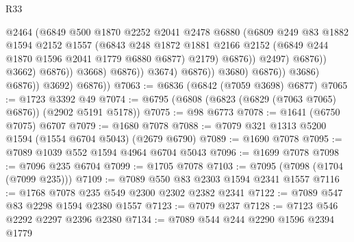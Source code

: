 \begin{lexlean}{R33}
\begin{coremodule}
                                              @2464
                                              (@6849
                                                @500
                                                @1870
                                                @2252
                                                @2041
                                                @2478
                                                @6880
                                                (@6809
                                                  @249
                                                  @83
                                                  @1882
                                                  @1594
                                                  @2152
                                                  @1557
                                                  (@6843
                                                    @248
                                                    @1872
                                                    @1881
                                                    @2166
                                                    @2152
                                                    (@6849 @244 @1870 @1596 @2041 @1779 @6880 @6877)
                                                    @2179)
                                                  @6876))
                                              @2497)
                                            @6876))
                                        @3662)
                                      @6876))
                                  @3668)
                                @6876))
                            @3674)
                          @6876))
                      @3680)
                    @6876))
                @3686)
              @6876))
          @3692)
        @6876))
@7063 := @6836 (@6842 (@7059 @3698) @6877)
@7065 := @1723 @3392 @49
@7074 := @6795 (@6808 (@6823 (@6829 (@7063 @7065) @6876)) (@2902 @5191 @5178))
@7075 := @98 @6773
@7078 := @1641 (@6750 @7075) @6707
@7079 := @1680 @7078
@7088 := @7079 @321 @1313 @5200 @1594 (@1554 @6704 @5043) (@2679 @6790)
@7089 := @1690 @7078
@7095 := @7089 @1039 @552 @1594 @4964 @6704 @5043
@7096 := @1699 @7078
@7098 := @7096 @235 @6704
@7099 := @1705 @7078
@7103 := @7095 (@7098 (@1704 (@7099 @235)))
@7109 := @7089 @550 @83 @2303 @1594 @2341 @1557
@7116 := @1768 @7078 @235 @549 @2300 @2302 @2382 @2341
@7122 := @7089 @547 @83 @2298 @1594 @2380 @1557
@7123 := @7079 @237
@7128 := @7123 @546 @2292 @2297 @2396 @2380
@7134 := @7089 @544 @244 @2290 @1596 @2394 @1779

\end{coremodule}
\end{lexlean}
